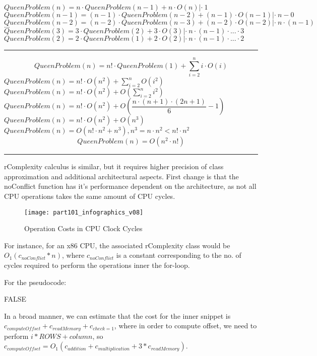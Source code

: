 $QueenProblem(n) = n \cdot QueenProblem(n-1) + n \cdot O(n) |\cdot\ 1$ \\
$QueenProblem(n-1) = (n-1) \cdot QueenProblem(n-2) + (n-1) \cdot O(n-1) |\cdot\ n-0$ \\
$QueenProblem(n-2) = (n-2) \cdot QueenProblem(n-3) + (n-2) \cdot O(n-2) |\cdot\ n\cdot (n-1)$ \\
$...$ \\
$QueenProblem(3) = 3 \cdot QueenProblem(2) + 3 \cdot O(3) |\cdot\ n\cdot (n-1) \cdot ... \cdot 3$ \\
$QueenProblem(2) = 2 \cdot QueenProblem(1) + 2 \cdot O(2) |\cdot\ n\cdot (n-1) \cdot ... \cdot 2$ \\
\noindent\rule{16cm}{0.4pt}
\[QueenProblem(n) = n! \cdot QueenProblem(1) + \sum_{i=2}^{n} i\cdot O(i) \] 
$QueenProblem(n) = n! \cdot O(n^2) + \sum_{i=2}^{n} O(i^2)$ \\
$QueenProblem(n) = n! \cdot O(n^2) +  O(\sum_{i=2}^{n} i^2)$ \\
$QueenProblem(n) = n! \cdot O(n^2) +  O(\dfrac{n\cdot(n+1)\cdot(2n+1)}{6} - 1)$ \\
$QueenProblem(n) = n! \cdot O(n^2) +  O(n^3)$ \\
$QueenProblem(n) = O(n! \cdot n^2 + n^3) , n^3 = n \cdot n^2 < n! \cdot n^2$ \\
\[QueenProblem(n) = O(n^2\cdot n!) \]
\noindent\rule{16cm}{0.4pt}

rComplexity calculus is similar, but it requires higher precision of class approximation and additional architectural aspects. 
First change is that the noConflict function has it's performance dependent on the architecture, as not all CPU operations takes the same amount of CPU cycles. 

\begin{figure}[H]
\centering
\texttt{[image: part101\_infographics\_v08]}
\caption{Operation Costs in CPU Clock Cycles\cite{archcost}}
\end{figure}

For instance, for an x86 CPU, the associated rComplexity class would be
$ O_{1}(c_{noConflict} * n) $, where $c_{noConflict}$ is a constant corresponding to the no. of cycles required to perform the operations inner the for-loop.

For the pseudocode:
\begin{algorithmic}[1]
			\State \Return FALSE
		\EndIf
	\EndFor
\end{algorithmic}
In a broad manner, we can estimate that the cost for the inner snippet is $c_{computeOffset} + c_{readMemory} + c_{check=1}$, where in order to compute offset, we need to perform $i * ROWS + column$, so
$ c_{computeOffset} = O_{1}(c_{addition} + c_{multiplication} + 3 * c_{readMemory})$.

